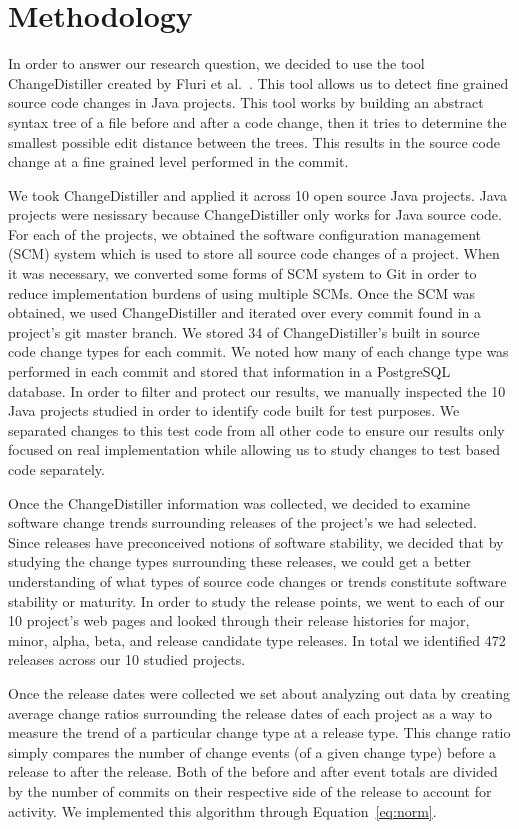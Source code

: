 \documentclass[conference]{IEEEtran}
\begin{document}
\section{Methodology}
\label{sec:meth}
In order to answer our research question, we decided to use the tool ChangeDistiller created by Fluri et al.~\cite{Fluri:2007:CDT}. This tool allows us to detect fine grained
source code changes in Java projects. This tool works by building an abstract syntax tree of a file before and after a code change, then it tries to determine
the smallest possible edit distance between the trees. This results in the source code change at a fine grained level performed in the commit.

We took ChangeDistiller and applied it across 10 open source Java projects. Java projects were nesissary because ChangeDistiller only works for Java source code.
For each of the projects, we obtained the software configuration management (SCM) system
which is used to store all source code changes of a project. When it was necessary, we converted some forms of SCM system to Git in order to reduce implementation
burdens of using multiple SCMs. Once the SCM was obtained, we used ChangeDistiller and iterated over every commit found in a project's git master branch. We stored
34 of ChangeDistiller's built in source code change types for each commit. We noted how many of each change type was performed in each commit and stored that information
in a PostgreSQL database. In order to filter and protect our results, we manually inspected the 10 Java projects studied in order to identify code built for test
purposes.
We separated changes to this test code from all other code to ensure our results only focused on real implementation while allowing us to study changes to
test based code separately.

Once the ChangeDistiller information was collected, we decided to examine software change trends surrounding releases of the project's we had selected. Since releases
have preconceived notions of software stability, we decided that by studying the change types surrounding these releases, we could get a better understanding of
what types of source code changes or trends constitute software stability or maturity. In order to study the release points, we went to each of our 10 project's 
web pages and looked through their release histories for major, minor, alpha, beta, and release candidate type releases. In total we identified 472 releases
across our 10 studied projects.  

Once the release dates were collected we set about analyzing out data by creating average change ratios surrounding the release dates of each 
project as a way to measure the trend of a particular change type at a release type. This change ratio simply compares the number of change events (of a given
change type) before a release to after the release. Both of the before and after event totals are divided by the number of commits on their respective side
of the release to account for activity. We implemented this algorithm through Equation~\ref{eq:norm}.
\end{document}
